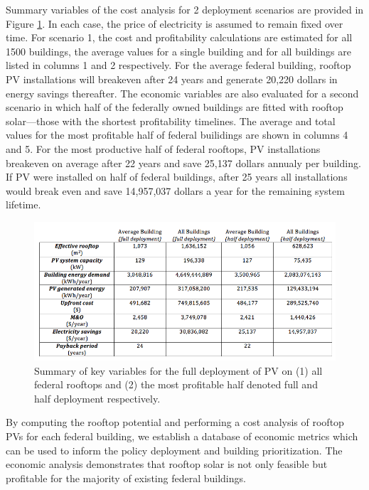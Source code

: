  Summary variables of the cost analysis for 2 deployment scenarios are provided in Figure \ref{fig:rtl_pic2}. In each case, the price of electricity is assumed to remain fixed over time. For scenario 1, the cost and profitability calculations are estimated for all 1500 buildings, the average values for a single building and for all buildings are listed in columns 1 and 2 respectively. For the average federal building, rooftop PV installations will breakeven after 24 years and generate 20,220 dollars in energy savings thereafter.  The economic variables are also evaluated for a second scenario in which half of the federally owned buildings are fitted with rooftop solar---those with the shortest profitability timelines. The average and total values for the most profitable half of federal builidings are shown in columns 4 and 5. For the most productive half of federal rooftops, PV installations breakeven on average after 22 years and save 25,137 dollars annualy per building. If PV were installed on half of federal buildings, after 25 years all installations would break even and save 14,957,037 dollars a year for the remaining system lifetime. 

\begin{figure}
  \centering
    \includegraphics[scale=0.5]{pics/rtl_pic2}
  \caption{Summary of key variables for the full deployment of PV on (1) all federal rooftops and (2) the most profitable half denoted full and half deployment respectively.}
  \label{fig:rtl_pic2}
\end{figure}

By computing the rooftop potential and performing a cost analysis of rooftop PVs for each federal building, we establish a database of economic metrics which can be used to inform the policy deployment and building prioritization. The economic analysis demonstrates that rooftop solar is not only feasible but profitable for the majority of existing federal buildings.

